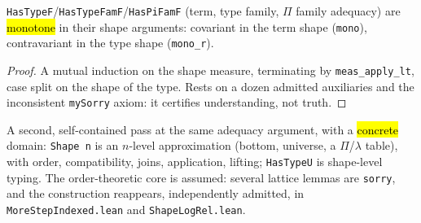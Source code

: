 \begin{lemma}
\label{family:expb-thierry-mono}
\leanok
{}

 \texttt{HasTypeF}/\texttt{HasTypeFamF}/\texttt{HasPiFamF} (term, type family, $\Pi$
family adequacy) are \hl{monotone} in their shape arguments: covariant in the term shape
(\texttt{mono}), contravariant in the type shape (\texttt{mono\_r}).
\end{lemma}
\begin{proof}
\leanok
{} A mutual induction on the shape measure, terminating by \texttt{meas\_apply\_lt}, case
split on the shape of the type.
 Rests on a dozen admitted auxiliaries and the inconsistent \texttt{mySorry} axiom: it
certifies understanding, not truth.
\end{proof}

\begin{definition}
\label{family:expb-thierry2-shape}
\leanok
{}

 A second, self-contained pass at the same adequacy argument, with a \hl{concrete}
domain: \texttt{Shape n} is an $n$-level approximation (bottom, universe, a $\Pi$/$\lambda$ table),
with order, compatibility, joins, application, lifting; \texttt{HasTypeU} is shape-level typing.
 The order-theoretic core is assumed: several lattice lemmas are \texttt{sorry}, and
the construction reappears, independently admitted, in \texttt{MoreStepIndexed.lean} and
\texttt{ShapeLogRel.lean}.
\end{definition}


